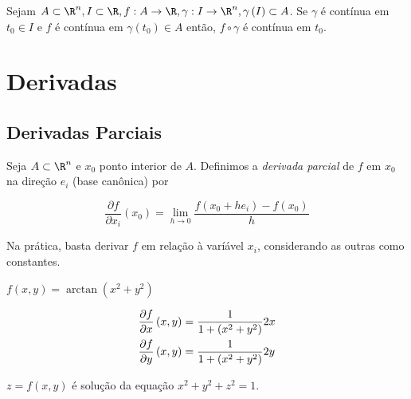 \documentclass[11pt, oneside, a4paper]{gsm-l}
\begin{document}
\begin{teo}
    Sejam $A \subset \R^n ,I \subset \R,f:A \to \R,\gamma :I \to \R^n ,\gamma \left( I \right) \subset A$. Se $\gamma$ é contínua em $t_0 \in I$ e $f$ é contínua em $\gamma \left( {t_0 } \right) \in A$ então, $f \circ \gamma$ é contínua em $t_0$.

\end{teo}

\chapter{Derivadas} \label{chap03}

\section{Derivadas Parciais} \label{sec12}

\begin{defi}
    Seja $A \subset \R^n$ e $x_0$ ponto interior de $A$. Definimos a \textit{derivada parcial} de $f$ em $x_0$ na direção $e_i$ (base can\^onica) por

\[\boxed{
    \frac{{\partial f}}{{\partial x_i }}\left( {x_0 } \right) = \mathop {\lim }\limits_{h \to 0} \frac{{f\left( {x_0  + he_i } \right) - f\left( {x_0 } \right)}}{h}}
\]

\end{defi}

Na prática, basta derivar $f$ em relação \`a varíável $x_i$, considerando as outras como constantes.

\begin{exem}
$f\left( {x,y} \right) = \arctan \left( {x^2  + y^2 } \right)$
\end{exem}

\begin{sol}
\[
\begin{gathered}
\frac{{\partial f}}
{{\partial x}}\left( {x,y} \right) = \frac{1}
{{1 + \left( {x^2  + y^2 } \right)}}2x \hfill \\
\frac{{\partial f}}
{{\partial y}}\left( {x,y} \right) = \frac{1}
{{1 + \left( {x^2  + y^2 } \right)}}2y \hfill \\
\end{gathered}
\]
\end{sol}

\begin{exem}
$z = f\left( {x,y} \right)$ é solução da equação $x^2  + y^2  + z^2  = 1$.
\end{exem}
\end{document}
